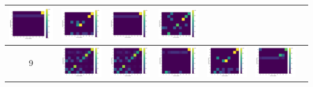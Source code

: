 \begin{tabular}{ |c|c|c|c|c|c|c| }
        \includegraphics[width=0.13\linewidth]{../results/8-clusters/accuracy - test 2.png} &
        \includegraphics[width=0.13\linewidth]{../results/8-clusters/accuracy - test 2 preprocessed.png} &
        \includegraphics[width=0.13\linewidth]{../results/8-clusters/accuracy - test 3.png} &
        \includegraphics[width=0.13\linewidth]{../results/8-clusters/accuracy - test 3 preprocessed.png} \\
    \hline
        9 & 
        \includegraphics[width=0.13\linewidth]{../results/9-clusters/accuracy - train.png} &
        \includegraphics[width=0.13\linewidth]{../results/9-clusters/accuracy - test 1.png} &
        \includegraphics[width=0.13\linewidth]{../results/9-clusters/accuracy - test 2.png} &
        \includegraphics[width=0.13\linewidth]{../results/9-clusters/accuracy - test 2 preprocessed.png} &
        \includegraphics[width=0.13\linewidth]{../results/9-clusters/accuracy - test 3.png} &

\end{tabular}
